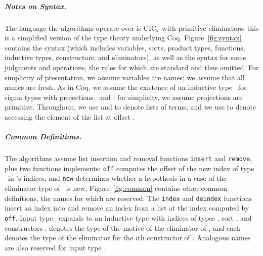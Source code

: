 \subparagraph*{Notes on Syntax.} The language the algorithms operate over is CIC$_{\omega}$ with primitive eliminators;
this is a simplified version of the type theory underlying Coq. Figure~\ref{fig:syntax}
contains the syntax (which includes variables, sorts, product types,
functions, inductive types, constructors, and eliminators),
as well as the syntax for some judgments and operations,
the rules for which are standard and thus omitted. 
For simplicity of presentation, we assume variables are names; 
we assume that all names are fresh.
As in Coq, we assume the existence of
an inductive type \sigT\ for sigma types with projections \Pil\ and \Pir;
for simplicity, we assume projections are primitive.
Throughout, we use  and  to denote
lists of terms, and we use  to denote accessing the element of the list  at offset .

\subparagraph*{Common Definitions.}
The algorithms assume list insertion and removal functions \lstinline{insert} and \lstinline{remove},
plus two functions \toolnameb implements:
\lstinline{off} computes the offset of the new index of type \IB\ in \B's indices,
and \lstinline{new} determines whether a hypothesis in a case of the eliminator type of \B\ is new.
Figure~\ref{fig:common} contains other common definitions, the names for which are reserved:
The \lstinline{index} and \lstinline{deindex} functions insert an index into and remove an index from a list
at the index computed by \lstinline{off}.
Input type \Aa\ expands to an inductive type with indices %
of types , sort , and constructors
.
 denotes the type of the motive of the eliminator of \Aa,
and each  denotes the type of the eliminator for the $i$th constructor of \Aa.
Analogous names are also reserved for input type \B.

